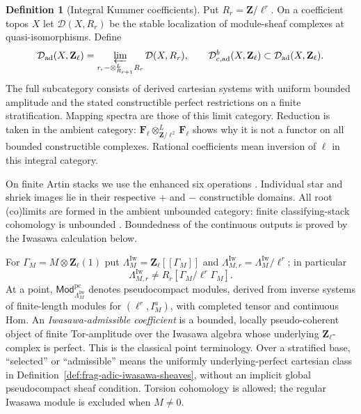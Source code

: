 \documentclass[11pt]{article}
\theoremstyle{definition}
\newtheorem{definition}[theorem]{Definition}
\theoremstyle{remark}
\begin{document}
\begin{definition}[Integral Kummer coefficients]
\label{def:frag-adic-coefficients}
Put $R_r=\mathbf Z/\ell^r$.  On a coefficient topos $X$ let
$\mathcal D(X,R_r)$ be the stable localization of module-sheaf
complexes at quasi-isomorphisms.  Define
\begin{equation}
 \mathcal D_{\mathrm{ad}}(X,\mathbf Z_\ell)
 =\varprojlim_{r,\,-\otimes^L_{R_{r+1}}R_r}\mathcal D(X,R_r),
 \qquad \mathcal D^b_{c,\mathrm{ad}}(X,\mathbf Z_\ell)
 \subset\mathcal D_{\mathrm{ad}}(X,\mathbf Z_\ell).
 \label{eq:frag-adic-infinity-category}
\end{equation}
The full subcategory consists of derived cartesian systems with
uniform bounded amplitude and the stated constructible perfect
restrictions on a finite stratification.  Mapping spectra are those
of this limit category.  Reduction is taken in the ambient category:
$\mathbf F_\ell\otimes^L_{\mathbf Z/\ell^2}\mathbf F_\ell$ shows why
it is not a functor on all bounded constructible complexes.
Rational coefficients mean inversion of $\ell$ in this integral category.

On finite Artin stacks we use the enhanced six operations
\cite{LaszloOlssonFinite,LaszloOlsson,LiuZhengEnhanced,LiuZhengAdic}.
Individual star and shriek images lie in their respective $+$ and
$-$ constructible domains.  All root (co)limits are formed in the
ambient unbounded category: finite classifying-stack cohomology is
unbounded \cite[Example 4.9.2]{LaszloOlssonFinite}.  Boundedness of the
continuous outputs is proved by the Iwasawa calculation below.

For $\Gamma_M=M\otimes\mathbf Z_\ell(1)$ put
$\Lambda_M^{\mathrm{Iw}}=\mathbf Z_\ell[[\Gamma_M]]$ and
$\Lambda_{M,r}^{\mathrm{Iw}}=\Lambda_M^{\mathrm{Iw}}/\ell^r$; in particular
\begin{equation}
 \Lambda_{M,r}^{\mathrm{Iw}}
 \ne R_r[\Gamma_M/\ell^r\Gamma_M].
 \label{eq:frag-iwasawa-not-finite-group-ring}
\end{equation}
At a point, $\mathsf{Mod}^{\mathrm{pc}}_{\Lambda_M^{\mathrm{Iw}}}$ denotes
pseudocompact modules, derived from inverse systems of finite-length
modules for $(\ell^r,I_M^a)$, with completed tensor and continuous Hom.
An \emph{Iwasawa-admissible coefficient} is a bounded, locally
pseudo-coherent object of finite Tor-amplitude over the Iwasawa
algebra whose underlying $\mathbf Z_\ell$-complex is perfect.
This is the classical point terminology.  Over a stratified base,
``selected'' or ``admissible'' means the uniformly underlying-perfect
cartesian class in Definition~\ref{def:frag-adic-iwasawa-sheaves},
without an implicit global pseudocompact sheaf condition.  Torsion cohomology
is allowed; the regular Iwasawa module is excluded when $M\ne0$.


\end{definition}
\end{document}

